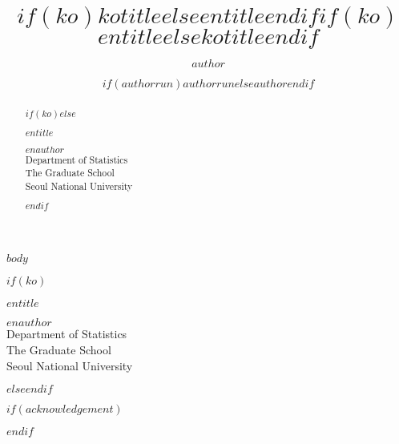 \documentclass[$if(twoside)$twoside,$else$oneside,$endif$$if(phd)$phd,$else$master,$endif$$if(ko)$ko,$endif$]{snuthesis}
\title{$if(ko)$$kotitle$$else$$entitle$$endif$}
\title*{$if(ko)$$entitle$$else$$kotitle$$endif$}
\author{$author$}
\author*{$if(authorrun)$$authorrun$$else$$author$$endif$} %
\begin{document}
\makefrontcover
\makefrontcover
\makeapproval

\cleardoublepage
{}

\begin{abstract}
$if(ko)$$else$
\begin{center}
\fontsize{22pt}{20pt} \selectfont
\textbf{
$entitle$}
\end{center}
\vspace{0.5cm}
\begin{flushright}
\fontsize{14pt}{12pt} \selectfont
$enauthor$ \\
Department of Statistics \\
The Graduate School \\
Seoul National University
\end{flushright}
\vspace{0.5cm}
$endif$
\noindent

\end{abstract}

\tableofcontents
\listoffigures
\listoftables

\cleardoublepage
{}

%
%

$body$







\begin{abstractalt}
$if(ko)$
\begin{center}
\fontsize{22pt}{26pt} \selectfont
\textbf{
$entitle$}
\end{center}
\begin{flushright}
\fontsize{14pt}{16pt} \selectfont
$enauthor$ \\
Department of Statistics \\
The Graduate School \\
Seoul National University
\end{flushright}
$else$$endif$

\end{abstractalt}

$if(acknowledgement)$
\acknowledgement

$endif$
\end{document}
